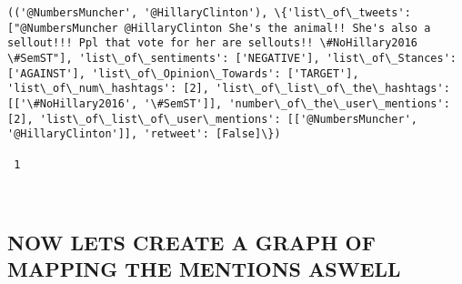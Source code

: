 \documentclass[11pt]{article}
\begin{document}
\begin{Verbatim}[commandchars=\\\{\}]
(('@NumbersMuncher', '@HillaryClinton'), \{'list\_of\_tweets': ["@NumbersMuncher @HillaryClinton She's the animal!! She's also a sellout!!! Ppl that vote for her are sellouts!! \#NoHillary2016 \#SemST"], 'list\_of\_sentiments': ['NEGATIVE'], 'list\_of\_Stances': ['AGAINST'], 'list\_of\_Opinion\_Towards': ['TARGET'], 'list\_of\_num\_hashtags': [2], 'list\_of\_list\_of\_the\_hashtags': [['\#NoHillary2016', '\#SemST']], 'number\_of\_the\_user\_mentions': [2], 'list\_of\_list\_of\_user\_mentions': [['@NumbersMuncher', '@HillaryClinton']], 'retweet': [False]\})

 1
 


    \end{Verbatim}

    \subsection{NOW LETS CREATE A GRAPH OF MAPPING THE MENTIONS
ASWELL}\label{now-lets-create-a-graph-of-mapping-the-mentions-aswell}
\end{document}
